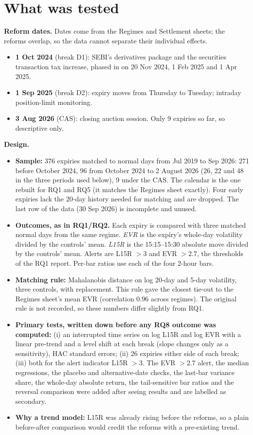 \documentclass[10pt,a4paper]{article}
\begin{document}
\section*{What was tested}
\textbf{Reform dates.} Dates come from the Regimes and Settlement sheets; the reforms overlap, so the data cannot separate their individual effects.
\begin{itemize}
\item \textbf{1 Oct 2024} (break D1): SEBI's derivatives package and the securities transaction tax increase, phased in on 20 Nov 2024, 1 Feb 2025 and 1 Apr 2025.
\item \textbf{1 Sep 2025} (break D2): expiry moves from Thursday to Tuesday; intraday position-limit monitoring.
\item \textbf{3 Aug 2026} (CAS): closing auction session. Only 9 expiries so far, so descriptive only.
\end{itemize}

\textbf{Design.}
\begin{itemize}
\item \textbf{Sample:} 376 expiries matched to normal days from Jul 2019 to Sep 2026: 271 before October 2024, 96 from October 2024 to 2 August 2026 (26, 22 and 48 in the three periods used below), 9 under the CAS. The calendar is the one rebuilt for RQ1 and RQ5 (it matches the Regimes sheet exactly). Four early expiries lack the 20-day history needed for matching and are dropped. The last row of the data (30 Sep 2026) is incomplete and unused.
\item \textbf{Outcomes, as in RQ1/RQ2.} Each expiry is compared with three matched normal days from the same regime. \emph{EVR} is the expiry's whole-day volatility divided by the controls' mean. \emph{L15R} is the 15:15--15:30 absolute move divided by the controls' mean. Alerts are L15R $>3$ and EVR $>2.7$, the thresholds of the RQ1 report. Per-bar ratios use each of the four 2-hour bars.
\item \textbf{Matching rule:} Mahalanobis distance on log 20-day and 5-day volatility, three controls, with replacement. This rule gave the closest tie-out to the Regimes sheet's mean EVR (correlation 0.96 across regimes). The original rule is not recorded, so these numbers differ slightly from RQ1.
\item \textbf{Primary tests, written down before any RQ8 outcome was computed:} (i) an interrupted time series on log L15R and log EVR with a linear pre-trend and a level shift at each break (slope changes only as a sensitivity), HAC standard errors; (ii) 26 expiries either side of each break; (iii) both for the alert indicator L15R $>3$. The EVR $>2.7$ alert, the median regressions, the placebo and alternative-date checks, the last-bar variance share, the whole-day absolute return, the tail-sensitive bar ratios and the reversal comparison were added after seeing results and are labelled as secondary.
\item \textbf{Why a trend model:} L15R was already rising before the reforms, so a plain before-after comparison would credit the reforms with a pre-existing trend.
\end{itemize}
\end{document}
